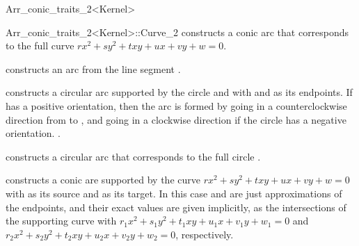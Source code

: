 \begin{ccRefClass}{Arr_conic_traits_2<Kernel>}
\begin{ccClass}{Arr_conic_traits_2<Kernel>::Curve_2}
  {constructs a conic arc that corresponds to the full curve $rx^2 + sy^2 + 
   txy + ux + vy + w = 0$.
   }

  {constructs an arc from the line segment .}

  {constructs a circular arc supported by the circle  and with 
    and  as its endpoints. If  has a positive
   orientation, then the arc is formed by going in a counterclockwise 
   direction from  to , and going in a clockwise direction if
   the circle has a negative orientation.
   .}

  {constructs a circular arc that corresponds to the full circle .}

  {constructs a conic are supported by the curve $rx^2 + sy^2 + txy + ux + 
   vy + w = 0$ with  as its source and  as its target.
   In this case  and   are just approximations of the 
   endpoints, and their exact values are given implicitly, as the 
   intersections of the supporting curve with $r_{1}x^2 + s_{1}y^2 + t_{1}xy +
    u_{1}x + v_{1}y + w_{1} = 0$ and $r_{2}x^2 + s_{2}y^2 + t_{2}xy +
    u_{2}x + v_{2}y + w_{2} = 0$, respectively.
   }


\end{ccClass}
\end{ccRefClass}
